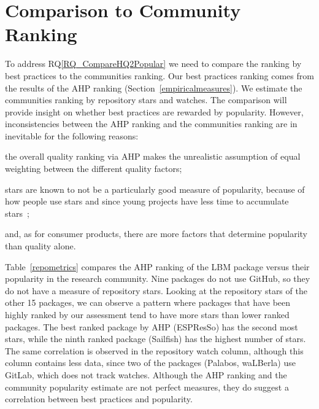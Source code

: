 \documentclass[runningheads]{llncs}
\newcommand{\rqref}[1]{RQ\ref{#1}}
\begin{document}
\section{Comparison to Community Ranking} \label{repmetrics}

To address \rqref{RQ_CompareHQ2Popular} we need to compare the ranking by best
practices to the communities ranking.  Our best practices ranking comes from the
results of the AHP ranking (Section~\ref{empiricalmeasures}).  We estimate the
communities ranking by repository stars and watches.  The comparison will
provide insight on whether best practices are rewarded by popularity.  However,
inconsistencies between the AHP ranking and the communities ranking are in
inevitable for the following reasons: 
\begin{inparaenum}[i)]
	\item the overall quality ranking via AHP makes the unrealistic assumption
	of equal weighting between the different quality factors;
	\item stars are known to not be a particularly good measure of popularity,
	because of how people use stars and since young projects have less time to
	accumulate stars~\cite{Szulik2017}; 
	\item and, as for consumer products, there are more factors that determine
	popularity than quality alone.
\end{inparaenum}

Table~\ref{repometrics} compares the AHP ranking of the LBM package versus their
popularity in the research community.  Nine packages do not use GitHub, so they
do not have a measure of repository stars. Looking at the repository stars of
the other 15 packages, we can observe a pattern where packages that have been
highly ranked by our assessment tend to have more stars than lower ranked
packages. The best ranked package by AHP (ESPResSo) has the second most stars,
while the ninth ranked package (Sailfish) has the highest number of stars. The
same correlation is observed in the repository watch column, although this
column contains less data, since two of the packages (Palabos, waLBerla) use
GitLab, which does not track watches. Although the AHP ranking and the community
popularity estimate are not perfect measures, they do suggest a correlation
between best practices and popularity.
\end{document}
